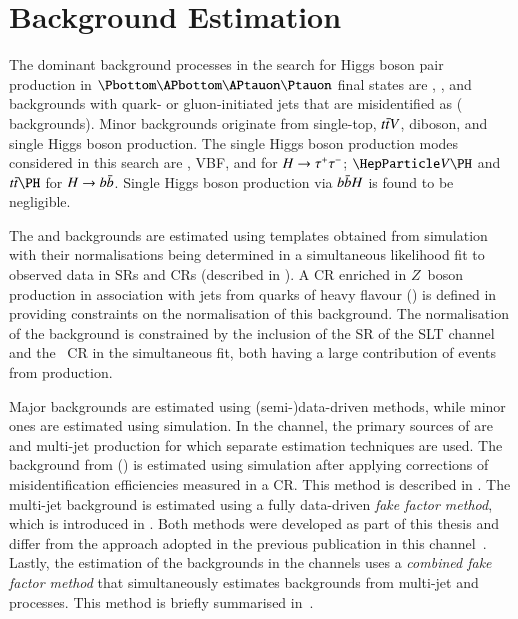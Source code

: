 \section{Background Estimation}%
\label{sec:background_estimation}

The dominant background processes in the search for Higgs boson pair production
in $\bbtautau$ final states are \Zjets, \ttbar, and backgrounds with quark- or
gluon-initiated jets that are misidentified as \tauhadvis (\faketauhadvis
backgrounds).
Minor backgrounds originate from single-top, $t\bar{t} V$, diboson, and single
Higgs boson production.  The single Higgs boson production modes considered in
this search are \ggF, VBF, \VH and \ttH for $H \to \tau^{+} \tau^{-}$; $\VH$ and $\ttH$
for $H \to b\bar{b}$. Single Higgs boson production via $b\bar{b} H$ is found to be
negligible.

The \Zjets and \ttbar backgrounds are estimated using templates obtained from
simulation with their normalisations being determined in a simultaneous
likelihood fit to observed data in SRs and CRs (described in
). A CR enriched in $Z$~boson production in
association with jets from quarks of heavy flavour (\ZHF) is defined in
 providing constraints on the normalisation of this
background. The normalisation of the \ttbar background is constrained by the
inclusion of the SR of the \lephad SLT channel and the \ZHF~CR in the
simultaneous fit, both having a large contribution of events from \ttbar
production.

Major \faketauhadvis backgrounds are estimated using (semi-)data-driven methods,
while minor ones are estimated using simulation. In the \hadhad channel, the
primary sources of \faketauhadvis are \ttbar and multi-jet production for which
separate estimation techniques are used. The \faketauhadvis background from
\ttbar (\ttbarFakes) is estimated using simulation after applying corrections of
\jettotauhadvis misidentification efficiencies measured in a CR. This method is
described in . The multi-jet background is
estimated using a fully data-driven \emph{fake factor method}, which is
introduced in . Both methods were developed as part of
this thesis and differ from the approach adopted in the previous publication in
this channel~\cite{HIGG-2016-16-witherratum}. Lastly, the estimation of the
\faketauhadvis backgrounds in the \lephad channels uses a \emph{combined fake
  factor method} that simultaneously estimates \faketauhadvis backgrounds from
multi-jet and \ttbar processes. This method is briefly summarised
in~.

